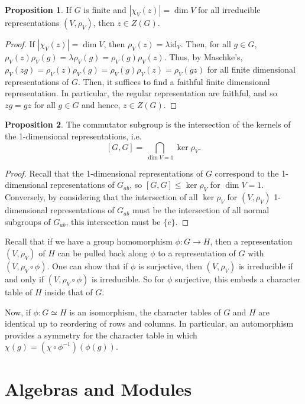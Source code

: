\documentclass[]{article}
\theoremstyle{definition}
\theoremstyle{definition}
\newtheorem{proposition}{Proposition}[section]
\begin{document}
\begin{proposition}
  If \(G\) is finite and \(|\chi_V(z)| = \dim V\) for all irreducible 
  representations \((V, \rho_V)\), then \(z \in Z(G)\). 
\end{proposition}
\begin{proof}
  If \(|\chi_V(z)| = \dim V\), then \(\rho_V(z) = \lambda\text{id}_V\). Then, 
  for all \(g \in G\), \(\rho_V(z)\rho_V(g) = \lambda\rho_V(g) = 
  \rho_V(g)\rho_V(z)\). Thus, by Maschke's, \(\rho_V(zg) = \rho_V(z)\rho_V(g) = 
  \rho_V(g)\rho_V(z) = \rho_V(gz)\) for all finite dimensional representations 
  of \(G\). Then, it suffices to find a faithful finite dimensional representation. 
  In particular, the regular representation are faithful, and so 
  \(z g = g z\) for all \(g \in G\) and hence, \(z \in Z(G)\).
\end{proof}

\begin{proposition}
  The commutator subgroup is the intersection of the kernels of 
  the 1-dimensional representations, i.e.
  \[[G, G] = \bigcap_{\dim V = 1} \ker \rho_V.\]
\end{proposition}
\begin{proof}
  Recall that the 1-dimensional representations of \(G\) correspond to the 
  1-dimensional representations of \(G_{ab}\), so \([G, G] \le \ker \rho_V\)
  for \(\dim V = 1\). Conversely, by considering that the intersection of 
  all \(\ker \rho_V\) for \((V, \rho_V)\) 1-dimensional representations of 
  \(G_{ab}\) must be the intersection of all normal subgroups of \(G_{ab}\), 
  this intersection must be \(\{e\}\).
\end{proof}

Recall that if we have a group homomorphism \(\phi : G \to H\), then a 
representation \((V, \rho_V)\) of \(H\) can be pulled back along \(\phi\) to 
a representation of \(G\) with \((V, \rho_V \circ \phi)\). One can show that 
if \(\phi\) is surjective, then \((V, \rho_V)\) is irreducible if and only 
if \((V, \rho_V \circ \phi)\) is irreducible. So for \(\phi\) surjective, 
this embeds a character table of \(H\) inside that of \(G\).

Now, if \(\phi : G \simeq H\) is an isomorphism, the character tables 
of \(G\) and \(H\) are identical up to reordering of rows and columns.
In particular, an automorphism provides a symmetry for the character table 
in which \(\chi(g) = (\chi \circ \phi^{-1})(\phi(g))\).

\newpage
\section{Algebras and Modules}
\end{document}
